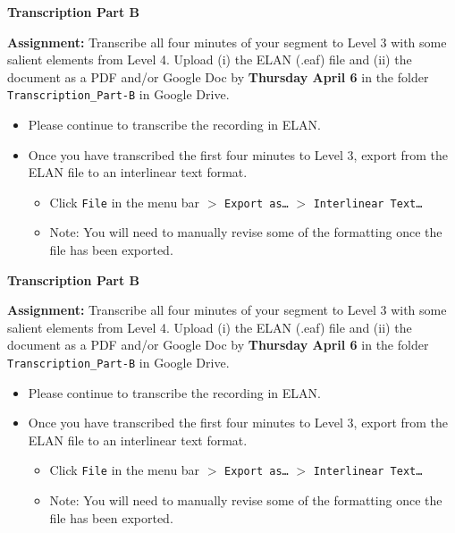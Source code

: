 \documentclass{article}
\begin{document}
\begin{center}
  \textbf{Transcription Part B}
\end{center}

\noindent\textbf{Assignment:} Transcribe all four minutes of your segment to Level 3 with some salient elements from Level 4. Upload (i) the ELAN (.eaf) file and (ii) the document as a PDF and/or Google Doc by \textbf{Thursday April 6} in the folder \texttt{Transcription\_Part-B} in Google Drive.

\begin{itemize}
  \item Please continue to transcribe the recording in ELAN.
  \item Once you have transcribed the first four minutes to Level 3, export from the ELAN file to an interlinear text format. 
  \begin{itemize}
    \item Click \texttt{File} in the menu bar $>$ \texttt{Export as\ldots} $>$ \texttt{Interlinear Text\ldots}
    \item Note: You will need to manually revise some of the formatting once the file has been exported.
  \end{itemize}
\end{itemize}

\vfill

\begin{center}
  \textbf{Transcription Part B}
\end{center}

\noindent\textbf{Assignment:} Transcribe all four minutes of your segment to Level 3 with some salient elements from Level 4. Upload (i) the ELAN (.eaf) file and (ii) the document as a PDF and/or Google Doc by \textbf{Thursday April 6} in the folder \texttt{Transcription\_Part-B} in Google Drive.

\begin{itemize}
  \item Please continue to transcribe the recording in ELAN.
  \item Once you have transcribed the first four minutes to Level 3, export from the ELAN file to an interlinear text format. 
  \begin{itemize}
    \item Click \texttt{File} in the menu bar $>$ \texttt{Export as\ldots} $>$ \texttt{Interlinear Text\ldots}
    \item Note: You will need to manually revise some of the formatting once the file has been exported.
  \end{itemize}
\end{itemize}
\end{document}
